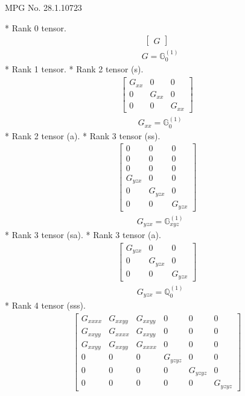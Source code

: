 \documentclass[fleqn,8pt,landscape]{jsarticle}
\begin{document}
\setcounter{MaxMatrixCols}{32}

\renewcommand{\tablename}{Table~}
\renewcommand{\figurename}{Figure~}
\begin{center}
\LARGE
MPG No. 28.1.107\quad$23$
\end{center}
* Rank 0 tensor.
\begin{align*}
\begin{bmatrix} G \end{bmatrix}
\end{align*}
\begin{align*}
& G = \mathbb{G}_{0}^{(1)}
\end{align*}
* Rank 1 tensor.
* Rank 2 tensor (s).
\begin{align*}
\begin{bmatrix} G_{xx} & 0 & 0 \\ 0 & G_{xx} & 0 \\ 0 & 0 & G_{xx} \end{bmatrix}
\end{align*}
\begin{align*}
& G_{xx} = \mathbb{G}_{0}^{(1)}
\end{align*}
* Rank 2 tensor (a).
* Rank 3 tensor (ss).
\begin{align*}
\begin{bmatrix} 0 & 0 & 0 \\ 0 & 0 & 0 \\ 0 & 0 & 0 \\ G_{yzx} & 0 & 0 \\ 0 & G_{yzx} & 0 \\ 0 & 0 & G_{yzx} \end{bmatrix}
\end{align*}
\begin{align*}
& G_{yzx} = \mathbb{G}_{xyz}^{(1)}
\end{align*}
* Rank 3 tensor (sa).
* Rank 3 tensor (a).
\begin{align*}
\begin{bmatrix} G_{yzx} & 0 & 0 \\ 0 & G_{yzx} & 0 \\ 0 & 0 & G_{yzx} \end{bmatrix}
\end{align*}
\begin{align*}
& G_{yzx} = \mathbb{Q}_{0}^{(1)}
\end{align*}
* Rank 4 tensor (sss).
\begin{align*}
\begin{bmatrix} G_{xxxx} & G_{xxyy} & G_{xxyy} & 0 & 0 & 0 \\ G_{xxyy} & G_{xxxx} & G_{xxyy} & 0 & 0 & 0 \\ G_{xxyy} & G_{xxyy} & G_{xxxx} & 0 & 0 & 0 \\ 0 & 0 & 0 & G_{yzyz} & 0 & 0 \\ 0 & 0 & 0 & 0 & G_{yzyz} & 0 \\ 0 & 0 & 0 & 0 & 0 & G_{yzyz} \end{bmatrix}
\end{align*}
\end{document}
